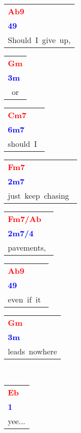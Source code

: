 \documentclass[12pt,a4paper,openany,UTF8]{memoir}
\begin{document}
\begin{tabular}[b]{l}
    \textbf{\textcolor{red}{Ab9}}\\\textbf{\textcolor{blue}{49}}\\
    Should~I~give~up,\mbox{}\end{tabular}\begin{tabular}[b]{l}
    \textbf{\textcolor{red}{Gm}}\\\textbf{\textcolor{blue}{3m}}\\
    ~or~\mbox{}\end{tabular}\begin{tabular}[b]{l}
    \textbf{\textcolor{red}{Cm7}}\\\textbf{\textcolor{blue}{6m7}}\\
    should~I~\mbox{}\end{tabular}\begin{tabular}[b]{l}
    \textbf{\textcolor{red}{Fm7}}\\\textbf{\textcolor{blue}{2m7}}\\
    just~keep~chasing~\mbox{}\end{tabular}\begin{tabular}[b]{l}
    \textbf{\textcolor{red}{Fm7/Ab}}\\\textbf{\textcolor{blue}{2m7/4}}\\
    pavements,~\mbox{}\end{tabular}\begin{tabular}[b]{l}
    \textbf{\textcolor{red}{Ab9}}\\\textbf{\textcolor{blue}{49}}\\
    even~if~it~\mbox{}\end{tabular}\begin{tabular}[b]{l}
    \textbf{\textcolor{red}{Gm}}\\\textbf{\textcolor{blue}{3m}}\\
    leads~nowhere\mbox{}\end{tabular}\\
\begin{tabular}[b]{l}
    \textbf{\textcolor{red}{Eb}}\\\textbf{\textcolor{blue}{1}}\\
    yee...\mbox{}\end{tabular}

    \vspace{\parskip}
\end{document}
